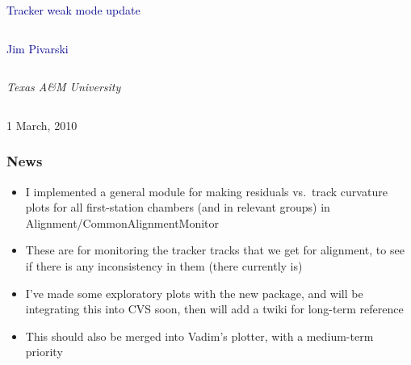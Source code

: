 \documentclass[compress]{beamer}
\begin{document}
\begin{frame}
\vfill
\begin{center}
\textcolor{darkblue}{\Large Tracker weak mode update}

\vfill
\begin{columns}
\begin{center}
\large
\textcolor{darkblue}{Jim Pivarski}
\end{center}
\end{columns}

\begin{columns}
\begin{center}
\scriptsize
{\it Texas A\&M University}
\end{center}
\end{columns}

\vfill
 1 March, 2010

\end{center}
\end{frame}


\small

\begin{frame}
\frametitle{News}
\begin{itemize}\setlength{\itemsep}{0.5 cm}
\item I implemented a general module for making residuals vs.\ track
  curvature plots for all first-station chambers (and in relevant
  groups) in Alignment/CommonAlignmentMonitor
\item These are for monitoring the tracker tracks that we get for
  alignment, to see if there is any inconsistency in them (there
  currently is)
\item I've made some exploratory plots with the new package, and will
  be integrating this into CVS soon, then will add a twiki for
  long-term reference
\item This should also be merged into Vadim's plotter, with a
  medium-term priority
\end{itemize}
\end{frame}
\end{document}
